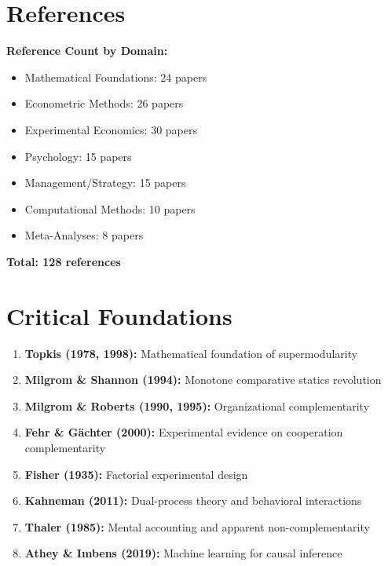 \section{References}
\label{sec:references}

\nocite{bcm_master}


\textbf{Reference Count by Domain:}
\begin{itemize}
    \item Mathematical Foundations: 24 papers
    \item Econometric Methods: 26 papers
    \item Experimental Economics: 30 papers
    \item Psychology: 15 papers
    \item Management/Strategy: 15 papers
    \item Computational Methods: 10 papers
    \item Meta-Analyses: 8 papers
\end{itemize}

\textbf{Total: 128 references}

\section{Critical Foundations}
\label{sec:critical-foundations}

\begin{enumerate}
    \item \textbf{Topkis (1978, 1998):} Mathematical foundation of supermodularity
    \item \textbf{Milgrom \& Shannon (1994):} Monotone comparative statics revolution
    \item \textbf{Milgrom \& Roberts (1990, 1995):} Organizational complementarity
    \item \textbf{Fehr \& Gächter (2000):} Experimental evidence on cooperation complementarity
    \item \textbf{Fisher (1935):} Factorial experimental design
    \item \textbf{Kahneman (2011):} Dual-process theory and behavioral interactions
    \item \textbf{Thaler (1985):} Mental accounting and apparent non-complementarity
    \item \textbf{Athey \& Imbens (2019):} Machine learning for causal inference
\end{enumerate}

